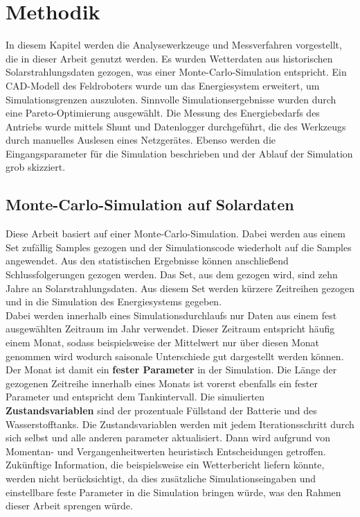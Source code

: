 \clearpage
\section{Methodik}
In diesem Kapitel werden die Analysewerkzeuge und Messverfahren vorgestellt, die in dieser Arbeit genutzt werden. Es wurden Wetterdaten aus historischen Solarstrahlungsdaten gezogen, was einer Monte-Carlo-Simulation entspricht. Ein CAD-Modell des Feldroboters wurde um das Energiesystem erweitert, um Simulationsgrenzen auszuloten. Sinnvolle Simulationsergebnisse wurden durch eine Pareto-Optimierung ausgewählt. Die Messung des Energiebedarfs des Antriebs wurde mittels Shunt und Datenlogger durchgeführt, die des Werkzeugs durch manuelles Auslesen eines Netzgerätes. Ebenso werden die Eingangsparameter für die Simulation beschrieben und der Ablauf der Simulation grob skizziert.
\subsection{Monte-Carlo-Simulation auf Solardaten}
Diese Arbeit basiert auf einer Monte-Carlo-Simulation. Dabei werden aus einem Set zufällig Samples gezogen und der Simulationscode wiederholt auf die Samples angewendet. Aus den statistischen Ergebnisse können anschließend Schlussfolgerungen gezogen werden. Das Set, aus dem gezogen wird, sind zehn Jahre an Solarstrahlungsdaten. Aus diesem Set werden kürzere Zeitreihen gezogen und in die Simulation des Energiesystems gegeben. \\
Dabei werden innerhalb eines Simulationsdurchlaufs nur Daten aus einem fest ausgewählten Zeitraum im Jahr verwendet. Dieser Zeitraum entspricht häufig einem Monat, sodass beispielsweise der Mittelwert nur über diesen Monat genommen wird wodurch saisonale Unterschiede gut dargestellt werden können. Der Monat ist damit ein \textbf{fester Parameter} in der Simulation. Die Länge der gezogenen Zeitreihe innerhalb eines Monats ist vorerst ebenfalls ein fester Parameter und entspricht dem Tankintervall. Die simulierten \textbf{Zustandsvariablen} sind der prozentuale Füllstand der Batterie und des Wasserstofftanks. Die Zustandsvariablen werden mit jedem Iterationsschritt durch sich selbst und alle anderen parameter aktualisiert. Dann wird aufgrund von Momentan- und Vergangenheitwerten heuristisch Entscheidungen getroffen. Zukünftige Information, die beispielsweise ein Wetterbericht liefern könnte, werden nicht berücksichtigt, da dies zusätzliche Simulationseingaben und einstellbare feste Parameter in die Simulation bringen würde, was den Rahmen dieser Arbeit sprengen würde.

